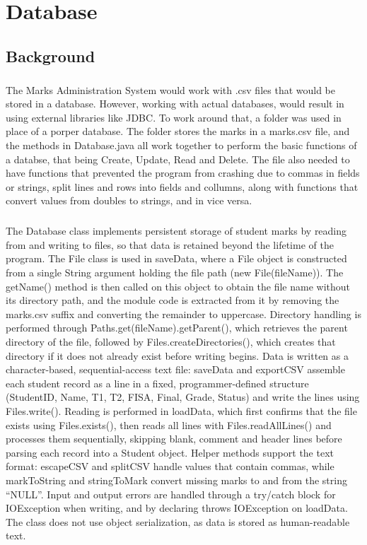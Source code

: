 \chapter{Database}
\section{Background}

\paragraph{}
The Marks Administration System would work with .csv files that would be stored in a database.
However, working with actual databases, would result in using external libraries
like JDBC. To work around that, a folder was used in place of a porper database.
The folder stores the marks in a marks.csv file, and the methods in Database.java 
all work together to perform the basic functions of a databse, that being Create, Update, Read and Delete.
The file also needed to have functions that prevented the program from crashing due to commas in fields or strings, 
split lines and rows into fields and collumns, along with functions that convert values from doubles to strings, and in vice versa.

\paragraph{}
The Database class implements persistent storage of student marks by reading from and writing to files, 
so that data is retained beyond
the lifetime of the program. The File class is used in saveData, where a File object is constructed from a single String argument 
holding the file path (new File(fileName)). 
The getName() method is then called on this object to obtain the file name without its 
directory path, and the module code is extracted from it by removing the marks.csv suffix and converting the remainder to uppercase. 
Directory handling is performed through Paths.get(fileName).getParent(), 
which retrieves the parent directory of the file, followed by 
Files.createDirectories(), which creates that directory if it does not already exist before writing begins. 
Data is written as a character-based, 
sequential-access text file: saveData and exportCSV assemble each student record as a line in a fixed, programmer-defined structure 
(StudentID, Name, T1, T2, FISA, Final, Grade, Status) 
and write the lines using Files.write(). 
Reading is performed in loadData, 
which first confirms that the file exists using Files.exists(), 
then reads all lines with Files.readAllLines() and processes them sequentially, 
skipping blank, comment and header lines before parsing each record into a Student object. Helper methods support the text format: escapeCSV and splitCSV 
handle values that contain commas, while markToString and stringToMark convert missing marks to and from the string “NULL”. Input and output errors are handled
through a try/catch block for IOException when writing, and by declaring throws IOException on loadData. The class does not use object serialization, as data is
stored as human-readable text.

